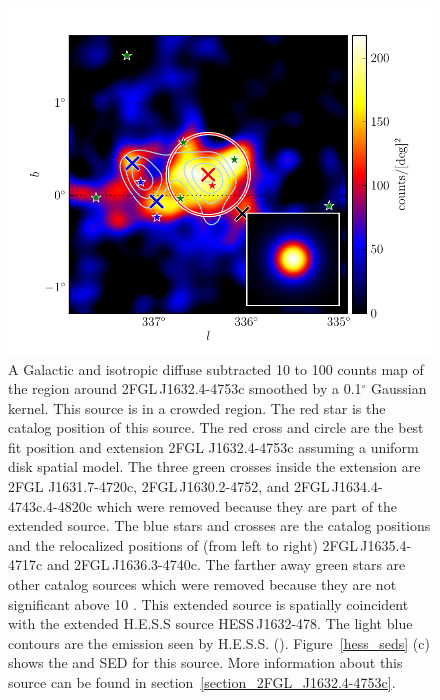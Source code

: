\documentclass[12pt,preprint]{aastex}
\newcommand{\gev}{\text{GeV}\xspace}
\newcommand{\tev}{\text{TeV}\xspace}
\renewcommand{\deg}{\ensuremath{^\circ}\xspace}
\begin{document}
\begin{figure}
  \begin{center}
    \includegraphics[type=pdf,ext=.pdf,read=.pdf]{source_plots/source_1FGL_J1632.9-4802c}
  \end{center}
  \caption{A Galactic and isotropic diffuse subtracted 10 \gev to 100
  \gev counts map of the region around 2FGL\,J1632.4-4753c smoothed by
  a 0.1\deg Gaussian kernel.  This source is in a crowded region.
  The red star is the catalog position of this source.  The red
  cross and circle are the best fit position and extension 2FGL
  J1632.4-4753c assuming a uniform disk spatial model.  The three
  green crosses inside the extension are 2FGL
  J1631.7-4720c, 2FGL\,J1630.2-4752, and 2FGL\,J1634.4-4743c.4-4820c
  which were removed because they are part
  of the extended source.  The blue stars and crosses are the catalog
  positions and the relocalized positions of (from left to right)
  2FGL\,J1635.4-4717c and 2FGL\,J1636.3-4740c.  The farther away green
  stars are other catalog sources which were removed because they are
  not significant above 10 \gev.  This extended source is spatially
  coincident with the extended H.E.S.S source HESS\,J1632-478.
  The light blue contours are the \tev emission seen by H.E.S.S.
  (\cite{hess_plane_survey}).  Figure~\ref{hess_seds} (c) shows the \gev and
  \tev SED for this source.  More information about this source can be
  found in section~\ref{section_2FGL_J1632.4-4753c}.
  }\label{1FGL_J1632.9-4802c}
\end{figure}
\end{document}
